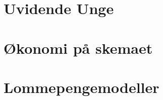 


\let\clearpage\relax



\chapter{Uvidende Unge}


\chapter{Økonomi på skemaet}


\chapter{Lommepengemodeller}






